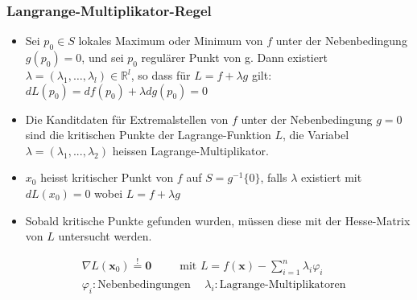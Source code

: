 \documentclass[a3paper, 11pt, landscape]{scrartcl}
\begin{document}
\begin{multicols*}{3}
	    \subsubsection{Langrange-Multiplikator-Regel}
		    \begin{itemize}
		        \item Sei $p_{0} \in S$ lokales Maximum oder Minimum von $f$ unter der Nebenbedingung $g\left(p_{0}\right)=0$, und sei $p_{0}$ regulärer Punkt von g. Dann existiert $\lambda=\left(\lambda_{1}, \ldots, \lambda_{l}\right) \in \mathbb{R}^{l}$, so dass für $L=f+\lambda g$ gilt: $d L\left(p_{0}\right)=d f\left(p_{0}\right)+\lambda d g\left(p_{0}\right)=0 $
		        \item Die Kanditdaten für Extremalstellen von $f$ unter der Nebenbedingung $g=0$ sind die kritischen Punkte der Lagrange-Funktion $L$, die Variabel $\lambda=(\lambda _1,...,\lambda _2)$ heissen Lagrange-Multiplikator.
		        \item $x_{0}$ heisst kritischer Punkt von $f$ auf $S=g^{-1}\{0\}$, falls $\lambda$ existiert mit $d L\left(x_{0}\right)=0$ wobei $L=f+\lambda g$
		        \item Sobald kritische Punkte gefunden wurden, müssen diese mit der Hesse-Matrix von $L$ untersucht werden.
		    \end{itemize}
		    
		
				\begin{align*}
					&\nabla L(\textbf{x}_0) \overset{!}{=} \textbf{0} \hspace{30pt} \text{mit } L=f(\textbf{x})-\sum_{i=1}^{n}\lambda_i \varphi_i\\
					&\varphi_i :\text{Nebenbedingungen} \hspace{15pt} \lambda_i: \text{Lagrange-Multiplikatoren}
				\end{align*}

\end{multicols*}
\end{document}
